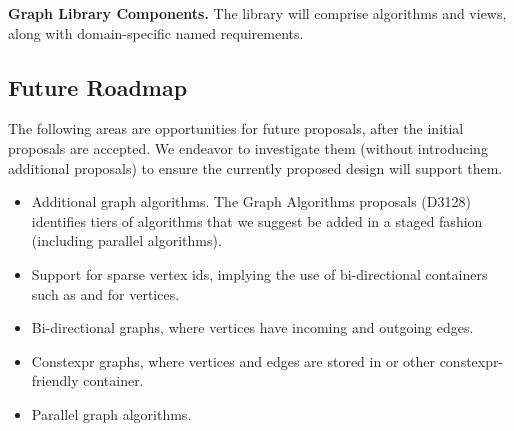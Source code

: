 \textbf{Graph Library Components.}  The library will comprise algorithms and views, along with domain-specific
named requirements.



\subsection{Future Roadmap}

\noindent
{}
\noindent

The following areas are opportunities for future proposals, after the initial proposals are accepted. We endeavor to investigate
them (without introducing additional proposals) to ensure the currently proposed design will support them.
\begin{itemize}
      \item Additional graph algorithms. The Graph Algorithms proposals (D3128) identifies tiers of algorithms that we suggest be added in a staged fashion (including parallel algorithms).
      \item Support for sparse vertex ids, implying the use of bi-directional containers such as  and  for vertices.
      \item Bi-directional graphs, where vertices have incoming and outgoing edges.
      \item Constexpr graphs, where vertices and edges are stored in  or other constexpr-friendly container.
      \item Parallel graph algorithms.
\end{itemize}



